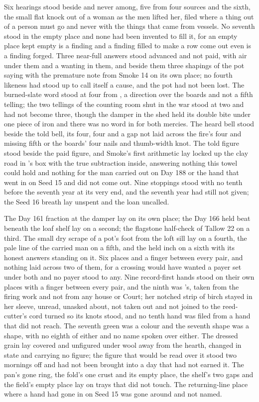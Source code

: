 Six hearings stood beside and never among, five from four sources and the sixth, the small flat knock out of a woman as the men lifted her, filed where a thing out of a person must go and never with the things that came from vessels. No seventh stood in the empty place and none had been invented to fill it, for an empty place kept empty is a finding and a finding filled to make a row come out even is a finding forged. Three near-full answers stood advanced and not paid, with air under them and a wanting in them, and beside them three shapings of the pot saying with the premature note from Smoke 14 on its own place; no fourth likeness had stood up to call itself a cause, and the pot had not been lost. The burned-slate word stood at four from , a direction over the boards and not a fifth telling; the two tellings of the counting room shut in the war stood at two and had not become three, though the damper in the shed held its double bite under one piece of iron and there was no word in  for both mercies. The heard bell stood beside the told bell, its four, four and a gap not laid across the fire's four and missing fifth or the boards' four nails and thumb-width knot. The told figure stood beside the paid figure, and Smoke's first arithmetic lay locked up the clay road in 's box with the true subtraction inside, answering nothing this towel could hold and nothing for the man carried out on Day 188 or the hand that went in on Seed 15 and did not come out. Nine stoppings stood with no tenth before the seventh year at its very end, and the seventh year had still not given; the Seed 16 breath lay unspent and the loan uncalled.

The Day 161 fraction at the damper lay on its own place; the Day 166 held beat beneath the loaf shelf lay on a second; the flagstone half-check of Tallow 22 on a third. The small dry scrape of a pot's foot from the loft sill lay on a fourth, the pale line of the carried man on a fifth, and the held inch on a sixth with its honest answers standing on it. Six places and a finger between every pair, and nothing laid across two of them, for a crossing would have wanted a payer set under both and no payer stood to any. Nine record-first hands stood on their own places with a finger between every pair, and the ninth was 's, taken from the firing work and not from any house or Court; her notched strip of birch stayed in her sleeve, unread, unasked about, not taken out and not joined to the reed-cutter's cord turned so its knots stood, and no tenth hand was filed from a hand that did not reach. The seventh green was a colour and the seventh shape was a shape, with no eighth of either and no name spoken over either. The dressed grain lay covered and unfigured under wool away from the hearth, changed in state and carrying no figure; the figure that would be read over it stood two mornings off and had not been brought into a day that had not earned it. The pan's gone ring, the fold's one crust and its empty place, the shelf's two gaps and the field's empty place lay on trays that did not touch. The returning-line place where a hand had gone in on Seed 15 was gone around and not named.

